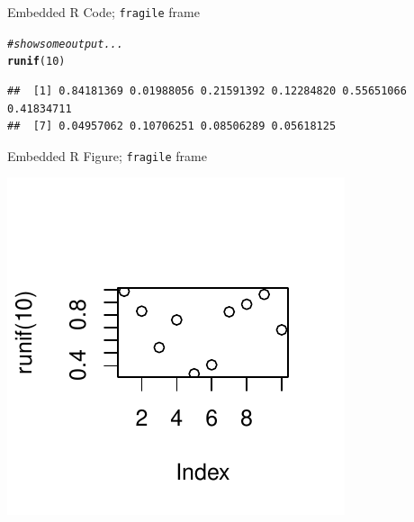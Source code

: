 \documentclass[12pt]{beamer}\usepackage[]{graphicx}\usepackage[]{color}
\makeatletter
\def\maxwidth{ %
  \ifdim\Gin@nat@width>\linewidth
    \linewidth
  \else
    \Gin@nat@width
  \fi
}
\newcommand{\hlnum}[1]{\textcolor[rgb]{0.686,0.059,0.569}{#1}}%
\newcommand{\hlcom}[1]{\textcolor[rgb]{0.678,0.584,0.686}{\textit{#1}}}%
\newcommand{\hlstd}[1]{\textcolor[rgb]{0.345,0.345,0.345}{#1}}%
\newcommand{\hlkwd}[1]{\textcolor[rgb]{0.737,0.353,0.396}{\textbf{#1}}}%
\newenvironment{kframe}{%
 \def\at@end@of@kframe{}%
 \ifinner\ifhmode%
  \def\at@end@of@kframe{\end{minipage}}%
  \begin{minipage}{\columnwidth}%
 \fi\fi%
 \def\FrameCommand##1{\hskip\@totalleftmargin \hskip-\fboxsep
 \colorbox{shadecolor}{##1}\hskip-\fboxsep
     \hskip-\linewidth \hskip-\@totalleftmargin \hskip\columnwidth}%
 \MakeFramed {\advance\hsize-\width
   \@totalleftmargin\z@ \linewidth\hsize
   \@setminipage}}%
 {\par\unskip\endMakeFramed%
 \at@end@of@kframe}
\newenvironment{knitrout}{}{} %
\makeatother
\begin{document}
\begin{frame}[fragile]{Embedded R Code; \texttt{fragile} frame}
\begin{block}

\begin{knitrout}
\color{fgcolor}\begin{kframe}
\begin{alltt}
\hlcom{# show some output...}
\hlkwd{runif}\hlstd{(}\hlnum{10}\hlstd{)}
\end{alltt}
\begin{verbatim}
##  [1] 0.84181369 0.01988056 0.21591392 0.12284820 0.55651066 0.41834711
##  [7] 0.04957062 0.10706251 0.08506289 0.05618125
\end{verbatim}
\end{kframe}
\end{knitrout}

\end{block}
\end{frame}

\begin{frame}[fragile]{Embedded R Figure; \texttt{fragile} frame}

\begin{knitrout}
\color{fgcolor}

{\centering \includegraphics[width=\maxwidth]{figure/unnamed-chunk-2-1} 

}



\end{knitrout}

\end{frame}
\end{document}
